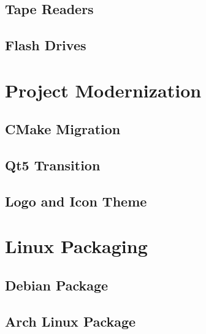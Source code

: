 \documentclass[12pt,a4paper,openright,twoside]{report}
\begin{document}
\section{Tape Readers}
\section{Flash Drives}
\chapter{Project Modernization}
\lhead[\fancyplain{}{\bfseries\thepage}]{\fancyplain{}{\bfseries\rightmark}}
\section{CMake Migration}
\section{Qt5 Transition}
\section{Logo and Icon Theme}
\chapter{Linux Packaging}
\lhead[\fancyplain{}{\bfseries\thepage}]{\fancyplain{}{\bfseries\rightmark}}
\section{Debian Package}
\section{Arch Linux Package}
\end{document}
